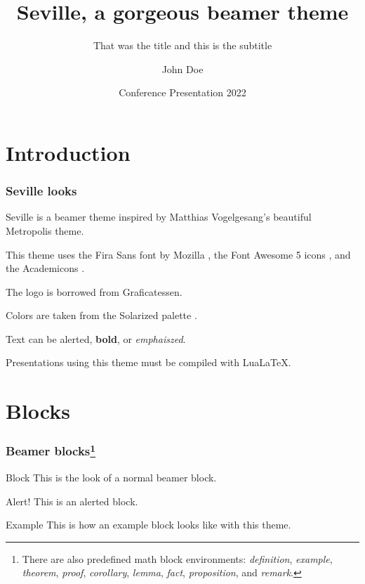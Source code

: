 \documentclass{beamer}
\title{Seville, a gorgeous beamer theme}
\subtitle{That was the title and this is the subtitle}
\author{John Doe}
\date{Conference Presentation 2022}
\institute{University of \LaTeX}
\begin{document}
\begin{frame}

    \titlepage

\end{frame}

\section{Introduction}

\begin{frame}
    \frametitle{Seville looks}

    Seville is a beamer theme inspired by Matthias Vogelgesang's beautiful Metropolis theme.

    This theme uses the Fira Sans font by Mozilla \faFirefoxBrowser, the Font Awesome 5 icons \faFontAwesome, and the Academicons \aiAcademiaSquare.

    The logo is borrowed from Graficatessen.

    Colors are taken from the Solarized palette \faPalette.

    Text can be \alert{alerted}, \textbf{bold}, or \emph{emphaiszed}.

    Presentations using this theme must be compiled with Lua\LaTeX.

\end{frame}

\section{Blocks}

\begin{frame}
    \frametitle{Beamer blocks\footnote{There are also predefined math block environments: \emph{definition}, \emph{example}, \emph{theorem}, \emph{proof}, \emph{corollary}, \emph{lemma}, \emph{fact}, \emph{proposition}, and \emph{remark}.}}

    \begin{block}{Block}
        This is the look of a normal beamer block.
    \end{block}

    \begin{alertblock}{Alert!}
        This is an alerted block.
    \end{alertblock}

    \begin{exampleblock}{Example}
        This is how an example block looks like with this theme.
    \end{exampleblock}

\end{frame}
\end{document}
